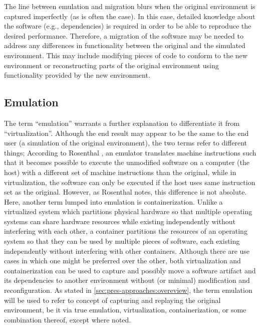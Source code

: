 \documentclass[letterpaper,11pt]{article}
\begin{document}
The line between emulation and migration blurs when the original environment is captured imperfectly (as is often the case). In this case, detailed knowledge about the software (e.g., dependencies) is required in order to be able to reproduce the desired performance. Therefore, a migration of the software may be needed to address any differences in functionality between the original and the simulated environment. This may include modifying pieces of code to conform to the new environment or reconstructing parts of the original environment using functionality provided by the new environment.


\subsection{Emulation}
\label{sec:pres-approaches:emulation}

The term ``emulation'' warrants a further explanation to differentiate it from ``virtualization''. Although the end result may appear to be the same to the end user (a simulation of the original environment), the two terms refer to different things; According to Rosenthal \citep{rosenthal2015}, an emulator translates machine instructions such that it becomes possible to execute the unmodified software on a computer (the host) with a different set of machine instructions than the original, while in virtualization, the software can only be executed if the host uses same instruction set as the original. However, as Rosenthal notes, this difference is not absolute. Here, another term lumped into emulation is containerization. Unlike a virtualized system which partitions physical hardware so that multiple operating systems can share hardware resources while existing independently without interfering with each other, a container partitions the resources of an operating system so that they can be used by multiple pieces of software, each existing independently without interfering with other containers. Although there are use cases in which one might be preferred over the other, both virtualization and containerization can be used to capture and possibly move a software artifact and its dependencies to another environment without (or minimal) modification and reconfiguration. As stated in \cref{sec:pres-approaches:overeview}, the term emulation will be used to refer to concept of capturing and replaying the original environment, be it via true emulation, virtualization, containerization, or some combination thereof, except where noted.  
\end{document}
